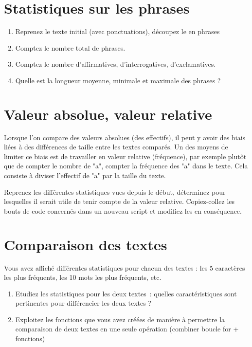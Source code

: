 \section{Statistiques sur les phrases}
\begin{enumerate}
  \item  Reprenez le texte initial (avec ponctuations), découpez le en phrases
  \item  Comptez le nombre total de phrases.
  \item  Comptez le nombre d'affirmatives, d'interrogatives, d'exclamatives.
  \item  Quelle est la longueur moyenne, minimale et maximale des phrases ?
\end{enumerate}

\section{Valeur absolue, valeur relative}

 Lorsque l'on compare des valeurs absolues (des effectifs), il peut y avoir des biais liées à des différences de taille entre les textes comparés.
 Un des moyens de limiter ce biais est de travailler en valeur relative (fréquence), par exemple plutôt que de compter le nombre de "a", compter la fréquence des "a" dans le texte.
Cela consiste à diviser l'effectif de "a" par la taille du texte.

\exer
 Reprenez les différentes statistiques vues depuis le début, déterminez pour lesquelles il serait utile de tenir compte de la valeur relative.
 Copiez-collez les bouts de code concernés dans un nouveau script et modifiez les en conséquence.
 
\section{Comparaison des textes}
Vous avez affiché différentes statistiques pour chacun des textes : les 5 caractères les plus fréquents, les 10 mots les plus fréquents, etc.

\exer
\begin{enumerate}
  \item  Etudiez les statistiques pour les deux textes : quelles caractéristiques sont pertinentes pour différencier les deux textes ?
  \item  Exploitez les fonctions que vous avez créées de manière à permettre la comparaison de deux textes en une seule opération (combiner boucle for + fonctions)
\end{enumerate}

